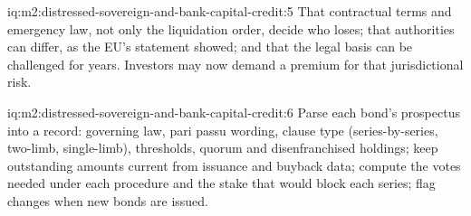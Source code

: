 \begin{solution}{iq:m2:distressed-sovereign-and-bank-capital-credit:5}
That contractual terms and emergency law, not only the liquidation order, decide who
loses; that authorities can differ, as the EU's statement showed; and that the legal
basis can be challenged for years. Investors may now demand a premium for that
jurisdictional risk.
\end{solution}

\begin{solution}{iq:m2:distressed-sovereign-and-bank-capital-credit:6}
Parse each bond's prospectus into a record: governing law, pari passu wording, clause
type (series-by-series, two-limb, single-limb), thresholds, quorum and disenfranchised
holdings; keep outstanding amounts current from issuance and buyback data; compute
the votes needed under each procedure and the stake that would block each series;
flag changes when new bonds are issued.
\end{solution}
